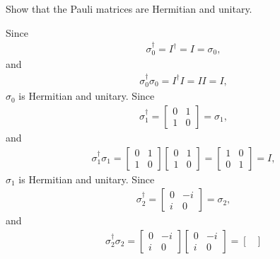 \documentclass[en]{sol-man}
\begin{document}
\begin{exe}
    Show that the Pauli matrices are Hermitian and unitary.
\end{exe}
\begin{pf}
    Since
    \begin{align}
        \sigma_0^{\dagger}=I^{\dagger}=I=\sigma_0,
    \end{align}
    and
    \begin{align}
        \sigma_0^{\dagger}\sigma_0=I^{\dagger}I=II=I,
    \end{align}
    $\sigma_0$ is Hermitian and unitary.
    Since
    \begin{align}
        \sigma_1^{\dagger}=\begin{bmatrix}
            0&1\\
            1&0
        \end{bmatrix}=\sigma_1,
    \end{align}
    and
    \begin{align}
        \sigma_1^{\dagger}\sigma_1=\begin{bmatrix}
            0&1\\
            1&0
        \end{bmatrix}\begin{bmatrix}
            0&1\\
            1&0
        \end{bmatrix}=\begin{bmatrix}
            1&0\\
            0&1
        \end{bmatrix}=I,
    \end{align}
    $\sigma_1$ is Hermitian and unitary.
    Since
    \begin{align}
        \sigma_2^{\dagger}=\begin{bmatrix}
            0&-i\\
            i&0
        \end{bmatrix}=\sigma_2,
    \end{align}
    and
    \begin{align}
        \sigma_2^{\dagger}\sigma_2=\begin{bmatrix}
            0&-i\\
            i&0
        \end{bmatrix}\begin{bmatrix}
            0&-i\\
            i&0
        \end{bmatrix}=\begin{bmatrix}

\end{bmatrix}
\end{align}
\end{pf}
\end{document}

